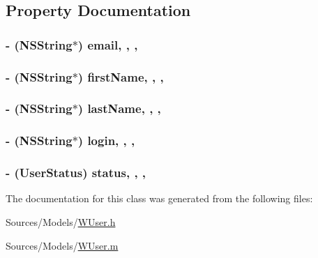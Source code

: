 \subsection{Property Documentation}
\hypertarget{interface_w_user_a16d6ebfd4831a4b06c8c06deb92ea6a8}{
\subsubsection[{email}]{\setlength{\rightskip}{0pt plus 5cm}-\/ (N\-S\-String$\ast$) email\hspace{0.3cm}{\ttfamily [read]}, {\ttfamily [write]}, {\ttfamily [nonatomic]}, {\ttfamily [retain]}}}\label{interface_w_user_a16d6ebfd4831a4b06c8c06deb92ea6a8}
\hypertarget{interface_w_user_a2e8310e8c82f1dddaeb5f9b40d4ca848}{
\subsubsection[{first\-Name}]{\setlength{\rightskip}{0pt plus 5cm}-\/ (N\-S\-String$\ast$) first\-Name\hspace{0.3cm}{\ttfamily [read]}, {\ttfamily [write]}, {\ttfamily [nonatomic]}, {\ttfamily [retain]}}}\label{interface_w_user_a2e8310e8c82f1dddaeb5f9b40d4ca848}
\hypertarget{interface_w_user_ae1605e1fc15b19f7010b511e9840dc82}{
\subsubsection[{last\-Name}]{\setlength{\rightskip}{0pt plus 5cm}-\/ (N\-S\-String$\ast$) last\-Name\hspace{0.3cm}{\ttfamily [read]}, {\ttfamily [write]}, {\ttfamily [nonatomic]}, {\ttfamily [retain]}}}\label{interface_w_user_ae1605e1fc15b19f7010b511e9840dc82}
\hypertarget{interface_w_user_acb79e445d2ad7977e3e2e83ac874a9fa}{
\subsubsection[{login}]{\setlength{\rightskip}{0pt plus 5cm}-\/ (N\-S\-String$\ast$) login\hspace{0.3cm}{\ttfamily [read]}, {\ttfamily [write]}, {\ttfamily [nonatomic]}, {\ttfamily [retain]}}}\label{interface_w_user_acb79e445d2ad7977e3e2e83ac874a9fa}
\hypertarget{interface_w_user_a5b93eafb209fdaeeb14343048da38c2a}{
\subsubsection[{status}]{\setlength{\rightskip}{0pt plus 5cm}-\/ ({\bf User\-Status}) status\hspace{0.3cm}{\ttfamily [read]}, {\ttfamily [write]}, {\ttfamily [nonatomic]}, {\ttfamily [assign]}}}\label{interface_w_user_a5b93eafb209fdaeeb14343048da38c2a}


The documentation for this class was generated from the following files\-:\begin{DoxyCompactItemize}
\item 
Sources/\-Models/\hyperlink{_w_user_8h}{W\-User.\-h}\item 
Sources/\-Models/\hyperlink{_w_user_8m}{W\-User.\-m}\end{DoxyCompactItemize}
